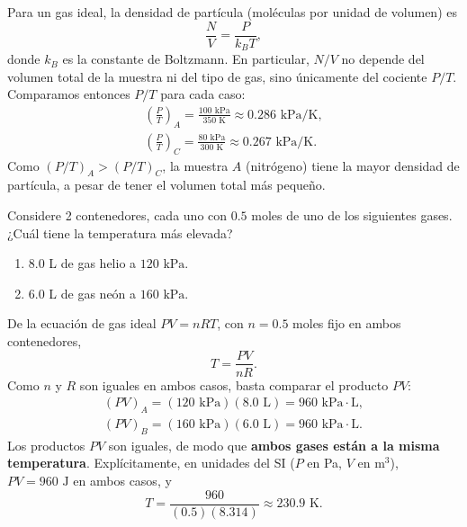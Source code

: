 \documentclass[12pt,a4paper]{article}
\newcommand{\paren}[1]{\left( #1 \right)}
\begin{document}
    \begin{solucion}
        Para un gas ideal, la densidad de partícula (moléculas por unidad de volumen) es
        \begin{equation*}
            \frac{N}{V}=\frac{P}{k_{B}T},
        \end{equation*}
        donde $k_{B}$ es la constante de Boltzmann. En particular, $N/V$ no depende del volumen
        total de la muestra ni del tipo de gas, sino únicamente del cociente $P/T$. Comparamos
        entonces $P/T$ para cada caso:
        \begin{gather*}
            \paren{\frac{P}{T}}_{A}=\frac{100\text{ kPa}}{350\text{ K}}\approx0.286\text{ kPa/K},\\
            \paren{\frac{P}{T}}_{C}=\frac{80\text{ kPa}}{300\text{ K}}\approx0.267\text{ kPa/K}.
        \end{gather*}
        Como $\paren{P/T}_{A}>\paren{P/T}_{C}$, la muestra $A$ (nitrógeno) tiene la mayor
        densidad de partícula, a pesar de tener el volumen total más pequeño.
    \end{solucion}

    \begin{problema}
        Considere 2 contenedores, cada uno con $0.5$ moles de uno de los siguientes gases.
        ¿Cuál tiene la temperatura más elevada?
        \begin{enumerate}
            \item[(A)] $8.0$ L de gas helio a $120\text{ kPa}$.
            \item[(B)] $6.0$ L de gas neón a $160\text{ kPa}$.
        \end{enumerate}
    \end{problema}

    \begin{solucion}
        De la ecuación de gas ideal $PV=nRT$, con $n=0.5$ moles fijo en ambos contenedores,
        \begin{equation*}
            T=\frac{PV}{nR}.
        \end{equation*}
        Como $n$ y $R$ son iguales en ambos casos, basta comparar el producto $PV$:
        \begin{gather*}
            (PV)_{A}=(120\text{ kPa})(8.0\text{ L})=960\text{ kPa}\cdot\text{L},\\
            (PV)_{B}=(160\text{ kPa})(6.0\text{ L})=960\text{ kPa}\cdot\text{L}.
        \end{gather*}
        Los productos $PV$ son iguales, de modo que \textbf{ambos gases están a la misma
        temperatura}. Explícitamente, en unidades del SI ($P$ en Pa, $V$ en m$^{3}$),
        $PV=960\text{ J}$ en ambos casos, y
        \begin{equation*}
            T=\frac{960}{(0.5)(8.314)}\approx230.9\text{ K}.
        \end{equation*}
    \end{solucion}
\end{document}
